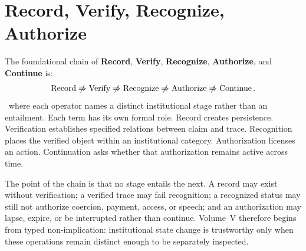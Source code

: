 
\chapter{Record, Verify, Recognize, Authorize}
\label{ch:ch047}

The foundational chain of \textbf{Record}, \textbf{Verify}, \textbf{Recognize}, \textbf{Authorize}, and \textbf{Continue} is:
\[
\operatorname{Record}
\centernot\Rightarrow
\operatorname{Verify}
\centernot\Rightarrow
\operatorname{Recognize}
\centernot\Rightarrow
\operatorname{Authorize}
\centernot\Rightarrow
\operatorname{Continue}.
\]
\Definition\ where each operator names a distinct institutional stage rather than an entailment.
Each term has its own formal role. Record creates persistence. Verification establishes specified relations between claim and trace. Recognition places the verified object within an institutional category. Authorization licenses an action. Continuation asks whether that authorization remains active across time.

The point of the chain is that no stage entails the next. A record may exist without verification; a verified trace may fail recognition; a recognized status may still not authorize coercion, payment, access, or speech; and an authorization may lapse, expire, or be interrupted rather than continue. Volume~V therefore begins from typed non-implication: institutional state change is trustworthy only when these operations remain distinct enough to be separately inspected.
